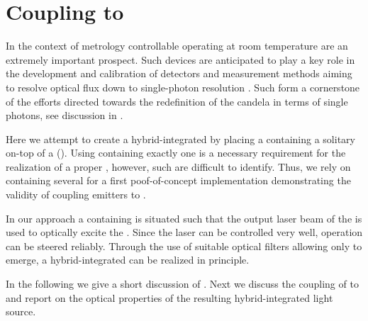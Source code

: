 
\section{Coupling \SIVS to \Vcsels} \label{sec::coupling_vcsel}

	In the context of metrology controllable \spss operating at room temperature are an extremely important prospect. Such devices are anticipated to play a key role in the development and calibration of detectors and measurement methods aiming to resolve optical flux down to single-photon resolution \cite{Vaigu2017}. Such \spss form a cornerstone of the efforts directed towards the redefinition of the candela in terms of single photons, see discussion in .

	Here we attempt to create a hybrid-integrated \sps by placing a \nd containing a solitary \siv on-top of a \vcsels (\VCSELs). Using \nds containing exactly one \siv is a necessary requirement for the realization of a proper \sps, however, such \nds are difficult to identify. Thus, we rely on \nds containing several \sivs for a first poof-of-concept implementation demonstrating the validity of coupling emitters to \VCSELs.

	In our approach a \nd containing \sivs is situated such that the output laser beam of the \VCSEL is used to optically excite the \cc. Since the \VCSEL laser can be controlled very well, \siv operation can be steered reliably. Through the use of suitable optical filters allowing only \siv \fl to emerge, a hybrid-integrated \sps can be realized in principle.

	In the following we give a short discussion of \VCSELs. Next we discuss the coupling of \sivs to \VCSELs and report on the optical properties of the resulting hybrid-integrated light source.

	\subsection{\Vcsels}\label{subsec::vcsel_structure}

